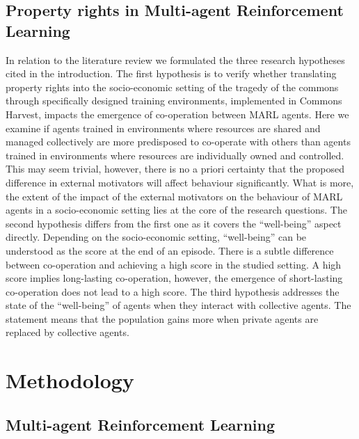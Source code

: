 \documentclass[preprint,12pt,authoryear]{elsarticle}
\begin{document}
\subsection{Property rights in Multi-agent Reinforcement Learning}
 
In relation to the literature review we formulated the three research hypotheses cited in the introduction. The first hypothesis is to verify whether translating property rights into the socio-economic setting of the tragedy of the commons through specifically designed training environments, implemented in Commons Harvest, impacts the emergence of co-operation between MARL agents. Here we examine if agents trained in environments where resources are shared and managed collectively are more predisposed to co-operate with others than agents trained in environments where resources are individually owned and controlled. This may seem trivial, however, there is no a priori certainty that the proposed difference in external motivators will affect behaviour significantly. What is more, the extent of the impact of the external motivators on the behaviour of MARL agents in a socio-economic setting lies at the core of the research questions. The second hypothesis differs from the first one as it covers the “well-being” aspect directly. Depending on the socio-economic setting, “well-being” can be understood as the score at the end of an episode. There is a subtle difference between co-operation and achieving a high score in the studied setting. A high score implies long-lasting co-operation, however, the emergence of short-lasting co-operation does not lead to a high score. The third hypothesis addresses the state of the “well-being” of agents when they interact with collective agents. The statement means that the population gains more when private agents are replaced by collective agents.



\section{Methodology}

\subsection{Multi-agent Reinforcement Learning}
\end{document}
